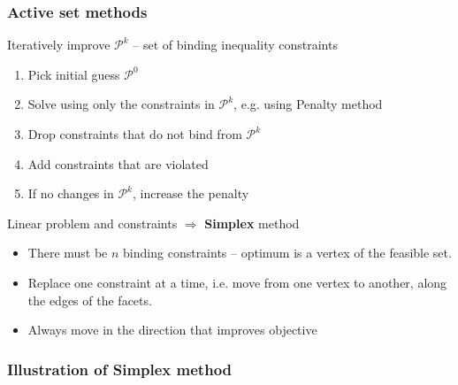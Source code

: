 \documentclass[bigger]{beamer}
\begin{document}
\begin{frame}%

\frametitle{Active set methods}

Iteratively improve $\mathcal{P}^{k}$ -- set of binding inequality
constraints

\begin{enumerate}
\item Pick initial guess $\mathcal{P}^{0}$

\item Solve using only the constraints in $\mathcal{P}^{k}$, e.g. using
Penalty method

\item Drop constraints that do not bind from $\mathcal{P}^{k}$

\item Add constraints that are violated

\item If no changes in $\mathcal{P}^{k}$, increase the penalty
\end{enumerate}

Linear problem and constraints $\Rightarrow $ \textbf{Simplex }method

\begin{itemize}
\item There must be $n$ binding constraints -- optimum is a vertex of the
feasible set.

\item Replace one constraint at a time, i.e. move from one vertex to
another, along the edges of the facets.

\item Always move in the direction that improves objective
\end{itemize}


\end{frame}%

\begin{frame}%

\frametitle{Illustration of Simplex method}



\end{frame}%
\end{document}
